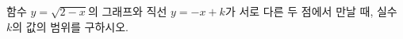 \hspace*{2mm}\begin{minipage}[t]{\dimexpr\linewidth-2mm\relax}\vspace{0pt}
함수 $y=\sqrt{2-x}$의 그래프와 직선 $y=-x+k$가 서로 다른 두 점에서 만날 때, 실수 $k$의 값의 범위를 구하시오.\end{minipage}
